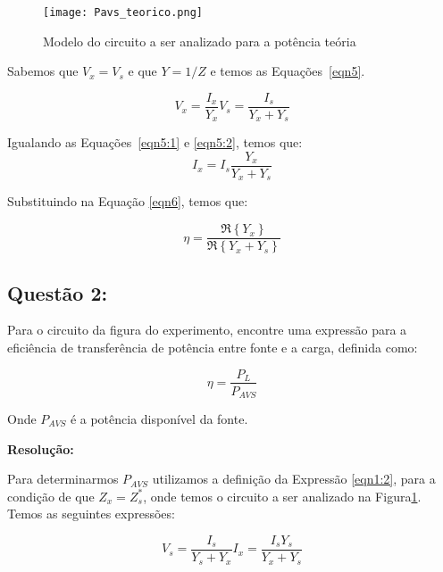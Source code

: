 \documentclass[a4paper,12pt]{proc}
\begin{document}
\begin{figure}[htbp]
    \centering
    \texttt{[image: Pavs\_teorico.png]}
    \caption{Modelo do circuito a ser analizado para a potência teória}
    \label{circuito_teorico}
\end{figure}

\noindent Sabemos que $V_{x} = V_{s}$ e que $Y=1/Z$ e temos as Equações~\ref{eqn5}.

\begin{subequations}
    \label{eqn5}
    \begin{equation}
        \label{eqn5:1}
        V_{x}= \frac{I_{x}}{Y_{x}}
    \end{equation}

    \begin{equation}
        \label{eqn5:2}
        V_{s}= \frac{I_{s}}{Y_{x}+Y_{s}}
    \end{equation}
\end{subequations}

\noindent Igualando as Equações~\ref{eqn5:1} e \ref{eqn5:2}, temos que:
\[I_{x} = I_{s}\frac{Y_{x}}{Y_{x}+Y_{s}}\]

\noindent Substituindo na Equação \ref{eqn6}, temos que:

\begin{equation}
    \eta = \frac{\Re\left \{ Y_{x} \right \}}{\Re\left \{ Y_{x} + Y_{s} \right \}}
    \label{eqn-z}
\end{equation}

\subsection{Questão 2:}

\noindent Para o circuito da figura do experimento, encontre uma expressão para a eficiência de transferência de potência entre fonte e a carga, definida como:

\[\eta = \frac{P_{L}}{P_{AVS}}\]

\noindent Onde $P_{AVS}$ é a potência disponível da fonte.

\singlespacing

\textbf{Resolução:}

\noindent Para determinarmos $P_{AVS}$ utilizamos a definição da Expressão \ref{eqn1:2}, para a condição de que $ Z_{x} = Z_{s}^{\ast}$, onde temos o circuito a ser analizado na Figura\ref{circuito_teorico}. Temos as seguintes expressões:

\begin{subequations}
    \label{pavs}

    \begin{equation}
        V_{s} =\frac{I_{s}}{Y_{s}+Y_{x}}
    \label{pavs:1}
    \end{equation}

    \begin{equation}
        I_{x} = \frac{I_{s}Y_{s}}{Y_{x} + Y_{s}}
    \label{pavs:2}
    \end{equation}

\end{subequations}
\end{document}
